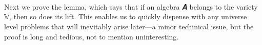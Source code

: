 \begin{code}
\AgdaSymbol{\}\{}\AgdaSpace{}%
\AgdaSpace{}%
\AgdaSpace{}%
\AgdaSymbol{\}\{}\AgdaSpace{}%
\AgdaSymbol{\}}\AgdaSpace{}%
\AgdaSymbol{)\}}\<%
\\
%
\>[1]\<%
\\
%
\\[\AgdaEmptyExtraSkip]%
%
\\[\AgdaEmptyExtraSkip]%
%
\>[1]\<%
\\
%
\>[1]\AgdaSpace{}%
\AgdaSpace{}%
\AgdaSpace{}%
\AgdaSymbol{:}\AgdaSpace{}%
\<%
\\
%
\>[1]\AgdaSpace{}%
\AgdaSymbol{=}\AgdaSpace{}%
\AgdaSpace{}%
\AgdaSpace{}%
\AgdaSpace{}%
\AgdaSpace{}%
\AgdaSpace{}%
\<%
\\
%
\>[1]\AgdaSpace{}%
\AgdaSymbol{=}\AgdaSpace{}%
\AgdaSpace{}%
\<%
\\
%
\>[1]\AgdaSpace{}%
\AgdaSymbol{=}\AgdaSpace{}%
\AgdaSpace{}%
\AgdaSpace{}%
\<%
\end{code}
\ccpad
Next we prove the  lemma, which says that if an algebra \ab 𝑨 belongs to the variety \af 𝕍, then so does its lift. This enables us to quickly dispense with any universe level problems that will inevitably arise later---a minor techinical issue, but the proof is long and tedious, not to mention uninteresting.
\ccpad
